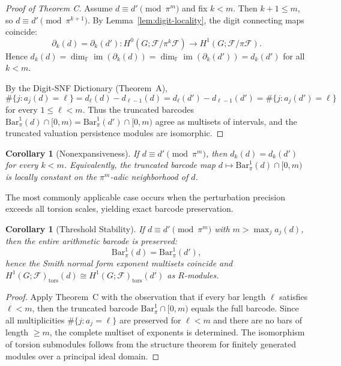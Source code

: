 \documentclass[11pt]{amsart}
\theoremstyle{plain}
\newtheorem{corollary}[theorem]{Corollary}
\theoremstyle{definition}
\newcommand{\Ring}{R}                          %
\newcommand{\unif}{\pi}                        %
\newcommand{\sheaf}[1]{\mathcal{#1}}                  %
\newcommand{\tors}{\mathrm{tors}}
\newcommand{\Digit}[1]{\partial_{#1}}%
\newcommand{\coboundary}{d}                           %
\DeclareMathOperator{\im}{im}                         %
\begin{document}
\begin{proof}[Proof of Theorem C]
Assume $\coboundary \equiv \coboundary' \pmod{\unif^m}$ and fix $k < m$. Then $k+1 \le m$, so $\coboundary \equiv \coboundary' \pmod{\unif^{k+1}}$. By Lemma~\ref{lem:digit-locality}, the digit connecting maps coincide:
\[
\Digit{k}(\coboundary) = \Digit{k}(\coboundary'): H^0(G;\sheaf{F}/\unif^k\sheaf{F}) \longrightarrow H^1(G;\sheaf{F}/\unif\sheaf{F}).
\]
Hence $d_k(\coboundary) = \dim_{\mathbb{F}} \im(\Digit{k}(\coboundary)) = \dim_{\mathbb{F}} \im(\Digit{k}(\coboundary')) = d_k(\coboundary')$ for all $k < m$.

By the Digit-SNF Dictionary (Theorem~A),
\[
\#\{j : a_j(\coboundary) = \ell\} = d_\ell(\coboundary) - d_{\ell-1}(\coboundary) = d_\ell(\coboundary') - d_{\ell-1}(\coboundary') = \#\{j : a_j(\coboundary') = \ell\}
\]
for every $1 \le \ell < m$. Thus the truncated barcodes $\mathrm{Bar}^1_\unif(\coboundary) \cap [0,m) = \mathrm{Bar}^1_\unif(\coboundary') \cap [0,m)$ agree as multisets of intervals, and the truncated valuation persistence modules are isomorphic.
\end{proof}


\begin{corollary}[Nonexpansiveness]
\label{cor:nonexpansive}
If $\coboundary \equiv \coboundary' \pmod{\unif^m}$, then $d_k(\coboundary) = d_k(\coboundary')$ for every $k < m$. Equivalently, the truncated barcode map $\coboundary \mapsto \mathrm{Bar}^1_\unif(\coboundary) \cap [0,m)$ is locally constant on the $\unif^m$-adic neighborhood of $\coboundary$.
\end{corollary}

The most commonly applicable case occurs when the perturbation precision exceeds all torsion scales, yielding exact barcode preservation.

\begin{corollary}[Threshold Stability]
\label{cor:threshold-stability}
If $\coboundary \equiv \coboundary' \pmod{\unif^m}$ with $m > \max_j a_j(\coboundary)$, then the entire arithmetic barcode is preserved:
\[
\mathrm{Bar}^1_\unif(\coboundary) = \mathrm{Bar}^1_\unif(\coboundary'),
\]
hence the Smith normal form exponent multisets coincide and $H^1(G;\sheaf{F})_{\tors}(\coboundary) \cong H^1(G;\sheaf{F})_{\tors}(\coboundary')$ as $\Ring$-modules.
\end{corollary}

\begin{proof}
Apply Theorem~C with the observation that if every bar length $\ell$ satisfies $\ell < m$, then the truncated barcode $\mathrm{Bar}^1_\unif \cap [0,m)$ equals the full barcode. Since all multiplicities $\#\{j : a_j = \ell\}$ are preserved for $\ell < m$ and there are no bars of length $\ge m$, the complete multiset of exponents is determined. The isomorphism of torsion submodules follows from the structure theorem for finitely generated modules over a principal ideal domain.
\end{proof}
\end{document}
